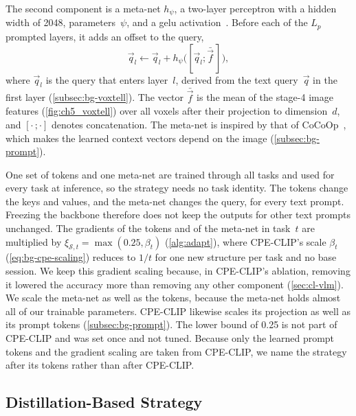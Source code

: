 The second component is a meta-net $h_\psi$, a two-layer perceptron with a hidden width of 2048, parameters~$\psi$, and a \gls{gelu} activation~\cite{hendrycks2016gelu}.
Before each of the $L_p$ prompted layers, it adds an offset to the query,
\begin{equation}
\vec{q}_l \leftarrow \vec{q}_l + h_\psi\big([\vec{q}_l; \bar{\vec{f}}\,]\big),
\label{eq:method-metanet}
\end{equation}
where $\vec{q}_l$ is the query that enters layer~$l$, derived from the text query~$\vec{q}$ in the first layer (\cref{subsec:bg-voxtell}).
The vector $\bar{\vec{f}}$ is the mean of the stage-4 image features (\cref{fig:ch5_voxtell}) over all voxels after their projection to dimension~$d$, and $[\cdot\,;\cdot]$ denotes concatenation.
The meta-net is inspired by that of CoCoOp~\cite{zhou2022cocoop}, which makes the learned context vectors depend on the image (\cref{subsec:bg-prompt}).

One set of tokens and one meta-net are trained through all tasks and used for every task at inference, so the strategy needs no task identity.
The tokens change the keys and values, and the meta-net changes the query, for every text prompt.
Freezing the backbone therefore does not keep the outputs for other text prompts unchanged.
The gradients of the tokens and of the meta-net in task~$t$ are multiplied by $\xi_{\mathcal{S},t} = \max(0.25, \beta_t)$ (\cref{alg:adapt}), where CPE-CLIP's scale $\beta_t$ (\cref{eq:bg-cpe-scaling}) reduces to $1/t$ for one new structure per task and no base session.
We keep this gradient scaling because, in CPE-CLIP's ablation, removing it lowered the accuracy more than removing any other component (\cref{sec:cl-vlm}).
We scale the meta-net as well as the tokens, because the meta-net holds almost all of our trainable parameters.
CPE-CLIP likewise scales its projection as well as its prompt tokens (\cref{subsec:bg-prompt}).
The lower bound of 0.25 is not part of CPE-CLIP and was set once and not tuned.
Because only the learned prompt tokens and the gradient scaling are taken from CPE-CLIP, we name the strategy after its tokens rather than after CPE-CLIP.

\subsection{Distillation-Based Strategy}
\label{subsec:method-distillation}

